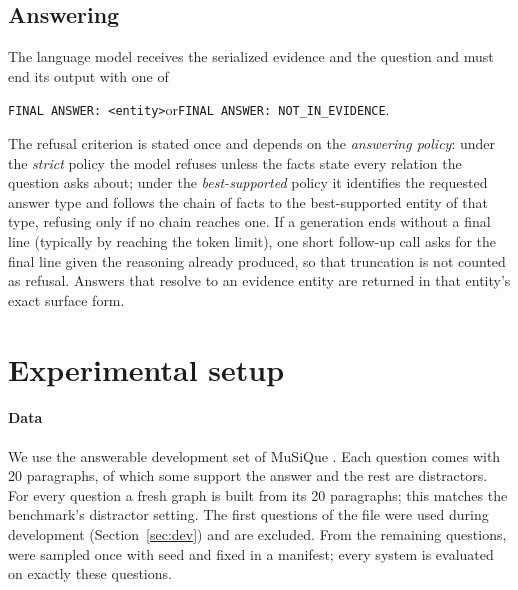 \documentclass[preprint,12pt,authoryear]{elsarticle}
\begin{document}
\subsection{Answering}

The language model receives the serialized evidence and the question and must end its output with one of
\begin{center}
\texttt{FINAL ANSWER: <entity>}\qquad or\qquad \texttt{FINAL ANSWER: NOT\_IN\_EVIDENCE}.
\end{center}
The refusal criterion is stated once and depends on the \emph{answering policy}:
under the \emph{strict} policy the model refuses unless the facts state every relation the question asks about;
under the \emph{best-supported} policy it identifies the requested answer type and follows the chain of facts to the best-supported entity of that type, refusing only if no chain reaches one.
If a generation ends without a final line (typically by reaching the token limit), one short follow-up call asks for the final line given the reasoning already produced, so that truncation is not counted as refusal.
Answers that resolve to an evidence entity are returned in that entity's exact surface form.

\section{Experimental setup}
\label{sec:setup}

\paragraph{Data}
We use the answerable development set of MuSiQue \citep{trivedi2022musique}.
Each question comes with 20 paragraphs, of which some support the answer and the rest are distractors.
For every question a fresh graph is built from its 20 paragraphs; this matches the benchmark's distractor setting.
The first \ResNDev{} questions of the file were used during development (Section~\ref{sec:dev}) and are excluded.
From the remaining questions, \ResNTest{} were sampled once with seed \ResSeed{} and fixed in a manifest; every system is evaluated on exactly these questions.
\end{document}
